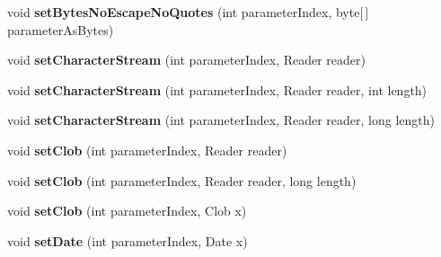 \begin{DoxyCompactItemize}
void {\bfseries set\+Bytes\+No\+Escape\+No\+Quotes} (int parameter\+Index, byte\mbox{[}$\,$\mbox{]} parameter\+As\+Bytes)
\item 
\mbox{\label{classcom_1_1mysql_1_1cj_1_1_server_prepared_query_bindings_adc6219857846482f9a5baefdbd8c352a}} 
void {\bfseries set\+Character\+Stream} (int parameter\+Index, Reader reader)
\item 
\mbox{\label{classcom_1_1mysql_1_1cj_1_1_server_prepared_query_bindings_a632b1e99892136a3c50f8350a0339b67}} 
void {\bfseries set\+Character\+Stream} (int parameter\+Index, Reader reader, int length)
\item 
\mbox{\label{classcom_1_1mysql_1_1cj_1_1_server_prepared_query_bindings_a171e8671bae919df048e8c7d23d025cf}} 
void {\bfseries set\+Character\+Stream} (int parameter\+Index, Reader reader, long length)
\item 
\mbox{\label{classcom_1_1mysql_1_1cj_1_1_server_prepared_query_bindings_af017a913aaa0f7c3e12a9babc2ace30d}} 
void {\bfseries set\+Clob} (int parameter\+Index, Reader reader)
\item 
\mbox{\label{classcom_1_1mysql_1_1cj_1_1_server_prepared_query_bindings_a7a2d4a739f08e642b65a9cbd5aa122ed}} 
void {\bfseries set\+Clob} (int parameter\+Index, Reader reader, long length)
\item 
\mbox{\label{classcom_1_1mysql_1_1cj_1_1_server_prepared_query_bindings_af568e7385932d1444fa71e74dcf39f1f}} 
void {\bfseries set\+Clob} (int parameter\+Index, Clob x)
\item 
\mbox{\label{classcom_1_1mysql_1_1cj_1_1_server_prepared_query_bindings_a7158774ba21734eeafa31e3d4ae66457}} 
void {\bfseries set\+Date} (int parameter\+Index, Date x)
\item 
\mbox{\label{classcom_1_1mysql_1_1cj_1_1_server_prepared_query_bindings_a38a1c3be64866814f58b93d10f4685ce}} 

\end{DoxyCompactItemize}
